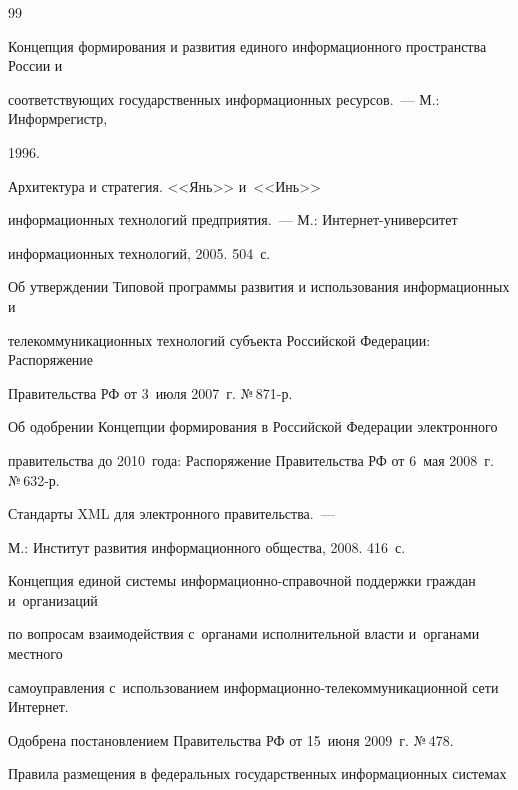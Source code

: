 {{\begin{thebibliography}{99}

Концепция формирования и развития единого информационного пространства России и

соответствующих государственных информационных ресурсов.~--- М.: Информрегистр,

1996.




 Архитектура и стратегия. <<Янь>> и~<<Инь>>

информационных технологий предприятия.~--- М.: Ин\-тер\-нет-уни\-вер\-си\-тет

информационных технологий, 2005. 504~с.




Об утверждении Типовой программы развития и использования информационных и

телекоммуникационных технологий субъекта Российской Федерации: Распоряжение

Правительства РФ от 3~июля 2007~г. №\,871-р.




Об одобрении Концепции формирования в Российской Федерации электронного

правительства до 2010~года: Распоряжение Правительства РФ от 6~мая 2008~г. №\,632-р.




 Стандарты XML для электронного правительства.~---

М.: Институт развития информационного общества, 2008. 416~с.




Концепция единой системы информационно-справочной поддержки граждан и~организаций

по вопросам взаимодействия с~органами исполнительной влас\-ти и~органами местного

самоуправления с~использованием ин\-фор\-ма\-ци\-он\-но-те\-ле\-ком\-му\-ни\-ка\-ци\-он\-ной сети Интернет.

Одобрена постановлением Правительства РФ от 15~июня 2009~г. №\,478.




Правила размещения в федеральных государственных информационных системах


\end{thebibliography}}}
